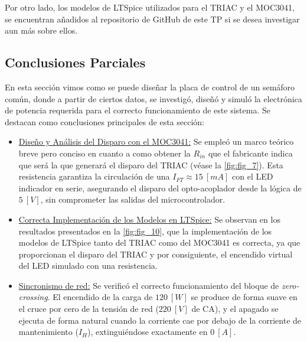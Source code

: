\documentclass[12pt,a4paper]{article}
\begin{document}
Por otro lado, los modelos de LTSpice utilizados para el TRIAC y el MOC3041, se encuentran añadidos al repositorio de GitHub de este TP si se desea investigar aun más sobre ellos.



\subsection{Conclusiones Parciales}
En esta sección vimos como se puede diseñar la placa de control de un semáforo común, donde a partir de ciertos datos, se investigó, diseñó y simuló la electrónica de potencia requerida para el correcto funcionamiento de este sistema. Se destacan como conclusiones principales de esta sección:
\begin{itemize}
    \item \underline{Diseño y Análisis del Disparo con el MOC3041:} Se empleó un marco teórico breve pero conciso en cuanto a como obtener la $R_{in}$ que el fabricante indica que será la que generará el disparo del TRIAC (véase la \autoref{fig:fig_7}). Esta resistencia garantiza la circulación de una $I_{FT} \approx 15 \ [mA]$ con el LED indicador en serie, asegurando el disparo del opto-acoplador desde la lógica de $5 \ [V]$, sin comprometer las salidas del microcontrolador.

    \item \underline{Correcta Implementación de los Modelos en LTSpice:} Se observan en los resultados presentados en la \autoref{fig:fig_10}, que la implementación de los modelos de LTSpice tanto del TRIAC como del MOC3041 es correcta, ya que proporcionan el disparo del TRIAC y por consiguiente, el encendido virtual del LED simulado con una resistencia.

    \item \underline{Sincronismo de red:} Se verificó el correcto funcionamiento del bloque de \textit{zero-crossing}. El encendido de la carga de $120 \ [W]$ se produce de forma suave en el cruce por cero de la tensión de red ($220 \ [V]$ de CA), y el apagado se ejecuta de forma natural cuando la corriente cae por debajo de la corriente de mantenimiento ($I_{H}$), extinguiéndose exactamente en $0 \ [A]$.
\end{itemize}
\end{document}
